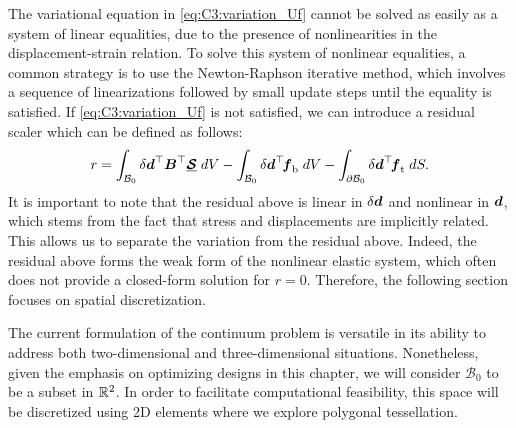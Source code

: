 The variational equation in \eqref{eq:C3:variation_Uf} cannot be solved as easily as a system of linear equalities, due to the presence of nonlinearities in the displacement-strain relation. To solve this system of nonlinear equalities, a common strategy is to use the Newton-Raphson iterative method, which involves a sequence of linearizations followed by small update steps until the equality is satisfied. If \eqref{eq:C3:variation_Uf} is not satisfied, we can introduce a residual scaler which can be defined as follows:
%
\begin{equation}
r = \int_{\mathcal{B}_0} \delta {\boldsymbol{d}}^\top {\boldsymbol{B}}^\top \underline{\boldsymbol{\mathcal{S}}}\; dV - \int_{\mathcal{B}_0}  \delta {\boldsymbol{d}}^\top \! {\boldsymbol{f}}_{\textrm{b}} \; dV - \int_{\partial \mathcal{B}_0}  \delta {\boldsymbol{d}}^\top \! {\boldsymbol{f}}_{\textrm{t}}  \; dS.
\label{eq:C3:residual_scalar}
\end{equation}
%
It is important to note that the residual above is linear in $\delta {\boldsymbol{d}}$ and nonlinear in ${\boldsymbol{d}}$, which stems from the fact that stress and displacements are implicitly related. This allows us to separate the variation from the residual above. Indeed, the residual above forms the weak form of the nonlinear elastic system, which often does not provide a closed-form solution for $r = 0$. Therefore, the following section focuses on spatial discretization.

\begin{rmk}
The current formulation of the continuum problem is versatile in its ability to address both two-dimensional and three-dimensional situations. Nonetheless, given the emphasis on optimizing  designs in this chapter, we will consider $\mathcal{B}_0$ to be a subset in $\mathbb{R}^2$. In order to facilitate computational feasibility, this space will be discretized using 2D elements where we explore polygonal tessellation.
\end{rmk}




